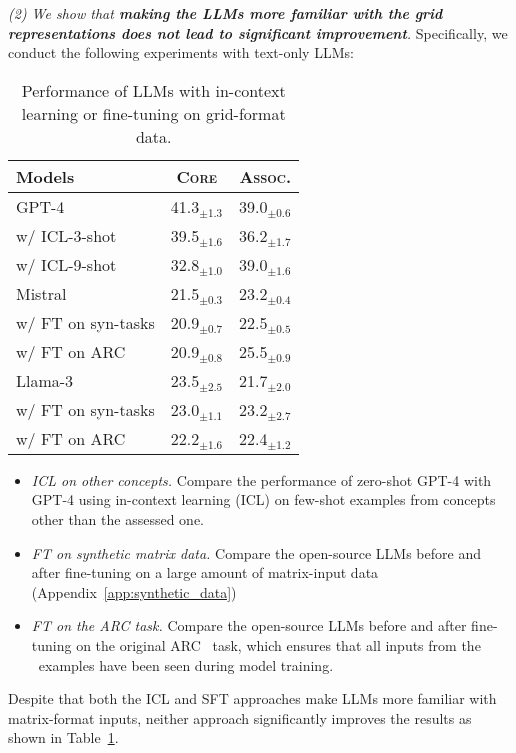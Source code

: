 {\emph{(2) We show that \textbf{making the LLMs more familiar with the grid representations does not lead to significant improvement}.} Specifically, we conduct the following experiments with text-only LLMs:
\begin{table}[h!]
    \small
    \centering
    \begin{tabular}{l cc}
    \toprule
     \bf Models   &  \bf \textsc{Core} & \bf \textsc{Assoc.}\\
    \midrule
    GPT-4 & 41.3$_{\pm\text{1.3}}$& 39.0$_{\pm\text{0.6}}$ \\
    \quad w/ ICL-3-shot &39.5$_{\pm\text{1.6}}$ &36.2$_{\pm\text{1.7}}$  \\
    \quad w/ ICL-9-shot &32.8$_{\pm\text{1.0}}$  & 39.0$_{\pm\text{1.6}}$ \\
    \midrule
    Mistral& 21.5$_{\pm\text{0.3}}$ & 23.2$_{\pm\text{0.4}}$\\
    \quad w/ FT on syn-tasks & 20.9$_{\pm\text{0.7}}$ &22.5$_{\pm\text{0.5}}$ \\
    \quad w/ FT on ARC & 20.9$_{\pm\text{0.8}}$& 25.5$_{\pm\text{0.9}}$\\
    \midrule    
    Llama-3 &  23.5$_{\pm\text{2.5}}$ & 21.7$_{\pm\text{2.0}}$ \\
    \quad w/ FT on syn-tasks & 23.0$_{\pm\text{1.1}}$ & 23.2$_{\pm\text{2.7}}$ \\
    \quad w/ FT on ARC & 22.2$_{\pm\text{1.6}}$ & 22.4$_{\pm\text{1.2}}$ \\
    \bottomrule
    \end{tabular}
    \caption{Performance of LLMs with in-context learning or fine-tuning on grid-format data.}
    \label{tab:performance_unsup_training}
    \vspace{-0.3in}
\end{table}

\begin{itemize}[noitemsep,nolistsep,leftmargin=*]
    \item \emph{ICL on other concepts. }
    Compare the performance of zero-shot GPT-4 with GPT-4 using in-context learning (ICL) on few-shot examples from concepts other than the assessed one.
    \item \emph{FT on synthetic matrix data. } Compare the open-source LLMs before and after fine-tuning on a large amount of matrix-input data (Appendix~\ref{app:synthetic_data})
    \item \emph{FT on the ARC task. } 
    Compare the open-source LLMs before and after fine-tuning on the original ARC~\cite{chollet2019measure} task, which ensures that all inputs from the \harddatasetns\ examples have been seen during model training.
\end{itemize}
Despite that both the ICL and SFT approaches make LLMs more familiar with matrix-format inputs, neither approach significantly improves the results as shown in Table~\ref{tab:performance_unsup_training}.


}
